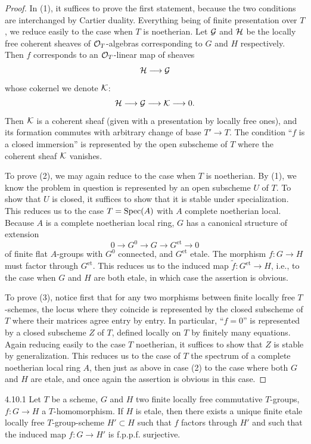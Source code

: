 \begin{proof}
In (1), it suffices to prove the first statement, because the two conditions are interchanged by Cartier duality. Everything being of finite presentation over $T$, we reduce easily to the case when $T$ is noetherian. Let $\mathcal{G}$ and $\mathcal{H}$ be the locally free coherent sheaves of $\mathcal{O}_T$-algebras corresponding to $G$ and $H$ respectively. Then $f$ corresponds to an $\mathcal{O}_T$-linear map of sheaves
\[
\mathcal{H} \longrightarrow \mathcal{G}
\]
whose cokernel we denote $\mathcal{K}$:
\[
\mathcal{H} \longrightarrow \mathcal{G} \longrightarrow \mathcal{K} \longrightarrow 0.
\]
Then $\mathcal{K}$ is a coherent sheaf (given with a presentation by locally free ones), and its formation commutes with arbitrary change of base $T' \to T$. The condition ``$f$ is a closed immersion'' is represented by the open subscheme of $T$ where the coherent sheaf $\mathcal{K}$ vanishes.

To prove (2), we may again reduce to the case when $T$ is noetherian. By (1), we know the problem in question is represented by an open subscheme $U$ of $T$. To show that $U$ is closed, it suffices to show that it is stable under specialization. This reduces us to the case $T = \operatorname{Spec}(A)$ with $A$ complete noetherian local. Because $A$ is a complete noetherian local ring, $G$ has a canonical structure of extension
\[
0 \longrightarrow G^0 \longrightarrow G \longrightarrow G^{\mathrm{et}} \longrightarrow 0
\]
of finite flat $A$-groups with $G^0$ connected, and $G^{\mathrm{et}}$ etale. The morphism $f : G \to H$ must factor through $G^{\mathrm{et}}$. This reduces us to the induced map $\tilde{f} : G^{\mathrm{et}} \to H$, i.e., to the case when $G$ and $H$ are both etale, in which case the assertion is obvious.

To prove (3), notice first that for any two morphisms between finite locally free $T$-schemes, the locus where they coincide is represented by the closed subscheme of $T$ where their matrices agree entry by entry. In particular, ``$f = 0$'' is represented by a closed subscheme $Z$ of $T$, defined locally on $T$ by finitely many equations. Again reducing easily to the case $T$ noetherian, it suffices to show that $Z$ is stable by generalization. This reduces us to the case of $T$ the spectrum of a complete noetherian local ring $A$, then just as above in case (2) to the case where both $G$ and $H$ are etale, and once again the assertion is obvious in this case.
\end{proof}

\begin{pcor}{4.10.1}\label{cor:4.10.1}
Let $T$ be a scheme, $G$ and $H$ two finite locally free commutative $T$-groups, $f : G \to H$ a $T$-homomorphism. If $H$ is etale, then there exists a unique finite etale locally free $T$-group-scheme $H' \subset H$ such that $f$ factors through $H'$ and such that the induced map $f : G \to H'$ is f.p.p.f. surjective.
\end{pcor}

